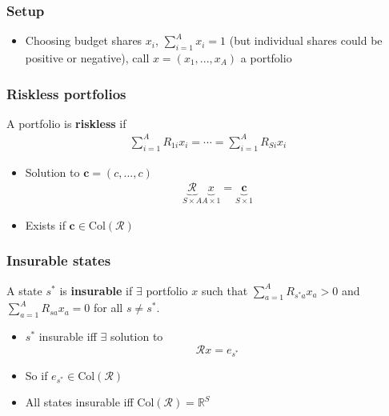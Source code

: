 \documentclass[compress]{beamer}
\def\R{\mathbb{R}}
\newcommand{\col}{\mathrm{Col}}
\begin{document}
\begin{frame}
  \frametitle{Setup}
  \begin{itemize}
  \item Choosing budget shares $x_i$, $\sum_{i=1}^A x_i = 1$ (but
    individual shares could be positive or negative), call $x =
    (x_1,...,x_A)$ a portfolio
  \end{itemize}
\end{frame}

\begin{frame} \frametitle{Riskless portfolios}
  \begin{definition}
    A portfolio is \textbf{riskless} if 
    \begin{align*}
      \sum_{i=1}^A R_{1i} x_i  =  \cdots   =\sum_{i=1}^A R_{Si} x_i 
    \end{align*}
  \end{definition}
  \begin{itemize}
  \item Solution to $\mathbf{c} = (c, ..., c)$
    \begin{align*}
      \underbrace{\mathcal{R}}_{S \times A} \underbrace{x}_{A \times 1} =
      \underbrace{\mathbf{c}}_{S \times 1}
    \end{align*}
  \item Exists if $\mathbf{c} \in \col(\mathcal{R})$
  \end{itemize}
\end{frame}

\begin{frame}\frametitle{Insurable states}
  \begin{definition}
    A state $s^*$ is \textbf{insurable} if $\exists$ portfolio $x$ such
    that $\sum_{a=1}^A R_{s^*a} x_a > 0$ and $\sum_{a=1}^A R_{sa} x_a =
    0$ for all $s \neq s^*$. 
  \end{definition}
  \begin{itemize}
  \item $s^*$ insurable iff $\exists$ solution to
    \[ \mathcal{R}x = e_{s^*} \] 
  \item So if $e_{s^*} \in \col(\mathcal{R})$
  \item All states insurable iff $\col(\mathcal{R}) = \R^S$
  \end{itemize}
\end{frame}
\end{document}
